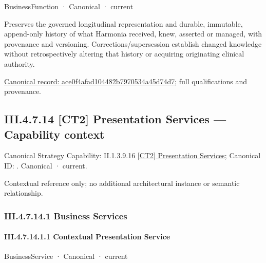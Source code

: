 \label{element:ace0f4afad104482b7970534a45d74d7}
{\small BusinessFunction · Canonical · current}\par

Preserves the governed longitudinal representation and durable, immutable, append-only history of what Harmonia received, knew, asserted or managed, with provenance and versioning. Corrections/supersession establish changed knowledge without retrospectively altering that history or acquiring originating clinical authority.


{\footnotesize \href{../../../../../../../continuum/business/business-function/ace0f4afad104482b7970534a45d74d7.md}{Canonical record: ace0f4afad104482b7970534a45d74d7}; full qualifications and provenance.}\par
\subsection*{III.4.7.14 [CT2] Presentation Services — Capability context}
\label{navigation:III.4.7.14}

{\small Canonical Strategy Capability: II.1.3.9.16 \hyperref[element:e9b6ba1917ba44cca7466444d0836c98]{[CT2] Presentation Services}; Canonical ID: \texttt{}. Canonical · current.}\par
Contextual reference only; no additional architectural instance or semantic relationship.\par
\subsubsection*{III.4.7.14.1 Business Services}
\label{navigation:III.4.7.14.1}

\paragraph*{III.4.7.14.1.1 Contextual Presentation Service}
\label{navigation:III.4.7.14.1.1}

\label{element:905d44b44f434fa4974e09dcafac016a}
{\small BusinessService · Canonical · current}\par

